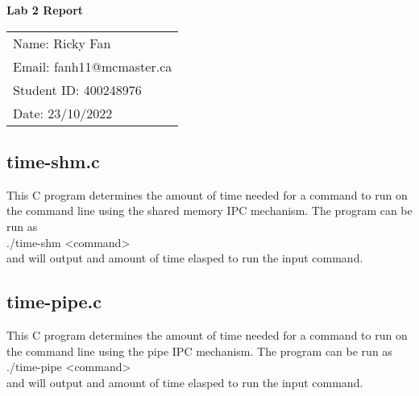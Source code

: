 \documentclass[11pt,fleqn]{article}
\begin{document}
\begin{center}
	{\Large \textbf{Lab 2 Report}}\\[6mm]
	\begin{tabular}{l}
        {\large Name: Ricky Fan}       \\
		{\large Email: fanh11@mcmaster.ca} \\
		{\large Student ID: 400248976}    \\
		{\large Date: 23/10/2022}
	\end{tabular}

\end{center}

\medskip

\subsection*{time-shm.c}
This C program determines the amount of time needed for a command to run 
on the command line using the shared memory IPC mechanism. 
The program can be run as \\

./time-shm \textless command\textgreater \\

\noindent
and will output and amount of time elasped to run the input command. 




\medskip

\subsection*{time-pipe.c}
This C program determines the amount of time needed for a command to run 
on the command line using the pipe IPC mechanism. 
The program can be run as \\

./time-pipe \textless command\textgreater \\

\noindent
and will output and amount of time elasped to run the input command. 

\noindent 


\end{document}
